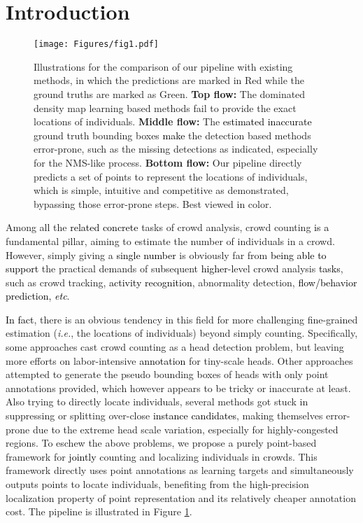 \documentclass[10pt,twocolumn,letterpaper]{article}
\newcommand{\ywunew}[1]{\textcolor{black}{#1}}
\newcommand{\ywu}[1]{\textcolor{black}{#1}}
\begin{document}
\section{Introduction}
\begin{figure}[t!]
    \centering
    \texttt{[image: Figures/fig1.pdf]}
    \caption{Illustrations for the comparison of our pipeline with existing methods, in which the predictions are marked in Red while the ground truths are marked as Green. \textbf{Top flow:} The dominated density map learning based methods fail to provide the exact locations of individuals. \textbf{Middle flow:} The \ywu{estimated inaccurate} ground truth bounding boxes \ywu{make} the detection based methods error-prone, such as the missing detections as indicated, especially for the NMS-like process. \textbf{Bottom flow:} Our pipeline directly predicts a set of points to represent the locations of individuals, which is simple, intuitive and competitive as demonstrated, bypassing those error-prone steps. Best viewed in color.}
    \label{fig1}
    \vspace{-1.8em}
\end{figure}
Among all the \ywu{related concrete} tasks of crowd analysis, crowd counting \ywu{is a} fundamental pillar, aiming to estimate the number of individuals in a crowd. However, simply giving a \ywu{single number} is obviously far from \ywu{being able to support} the practical demands of subsequent \ywu{higher}-level crowd analysis \ywu{tasks}, such as crowd tracking, \ywu{activity recognition}, abnormality detection, \ywu{flow/behavior prediction, \textit{etc}}. 

\ywu{In fact}, there is an obvious tendency in this field for more challenging fine-grained estimation (\textit{i.e.}, the locations of individuals) beyond simply counting. Specifically, some approaches cast crowd counting as a head detection problem, but leaving more efforts on labor-intensive \ywunew{annotation} for tiny-scale heads. Other approaches \cite{liu2019point, sam2020locate} attempted to generate the pseudo bounding boxes of heads with only point annotations provided, which however appears to be tricky or inaccurate at least. Also trying to directly locate individuals, several methods \cite{laradji2018blobs,liu2019recurrent} got stuck in suppressing or splitting over-close \ywunew{instance candidates}, making themselves error-prone due to the extreme head scale variation, especially for highly-congested regions. To eschew the above problems, we propose a purely point-based framework for \ywunew{jointly} counting and localizing individuals in crowds. This framework directly uses point annotations as learning targets and simultaneously outputs points to locate individuals, benefiting from the high-precision localization property of point representation and its relatively cheaper annotation cost. The pipeline is illustrated in Figure \ref{fig1}.
\end{document}
